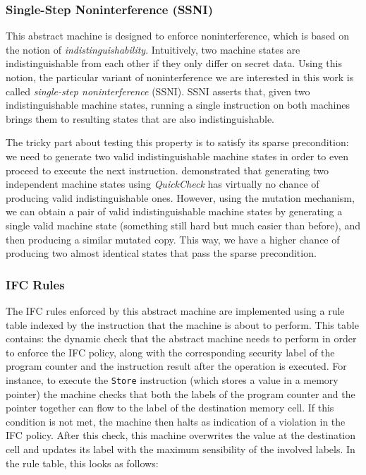\documentclass[sigconf, anonymous, review]{acmart}
\newcommand{\quickcheck}{\textit{QuickCheck}\xspace}
\begin{document}
\subsubsection{Single-Step Noninterference (SSNI)}

This abstract machine is designed to enforce noninterference, which is based on
the notion of \emph{indistinguishability}.
%
Intuitively, two machine states are indistinguishable from each other if they
only differ on secret data.
%
Using this notion, the particular variant of noninterference we are interested
in this work is called \emph{single-step noninterference}
\cite{hritcu2013testing} (SSNI).
%
SSNI asserts that, given two indistinguishable machine states, running a single
instruction on both machines brings them to resulting states that are also
indistinguishable.

The tricky part about testing this property is to satisfy its sparse
precondition: we need to generate two valid indistinguishable machine states in
order to even proceed to execute the next instruction.
%
\citeauthor{lampropoulos2019coverage} demonstrated that generating two
independent machine states using \quickcheck has virtually no chance of
producing valid indistinguishable ones.
%
However, using the mutation mechanism, we can obtain a pair of valid
indistinguishable machine states by generating a single valid machine state
(something still hard but much easier than before), and then producing a similar
mutated copy.
%
This way, we have a higher chance of producing two almost identical states that
pass the sparse precondition.

\subsubsection{IFC Rules}

The IFC rules enforced by this abstract machine are implemented using a rule
table indexed by the instruction that the machine is about to perform.
%
This table contains: the dynamic check that the abstract machine needs to
perform in order to enforce the IFC policy, along with the corresponding
security label of the program counter and the instruction result after the
operation is executed.
%
For instance, to execute the \texttt{Store} instruction (which stores a value in
a memory pointer) the machine checks that both the labels of the program counter
and the pointer together can flow to the label of the destination memory cell.
%
If this condition is not met, the machine then halts as indication of a
violation in the IFC policy.
%
After this check, this machine overwrites the value at the destination cell
and updates its label with the maximum sensibility of the involved labels.
%
In the rule table, this looks as follows:
\end{document}
